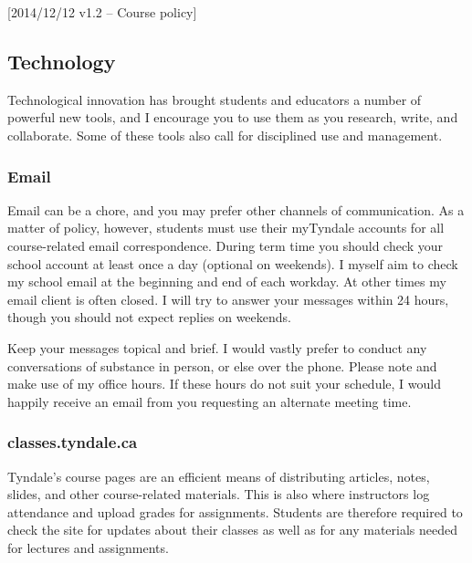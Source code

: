 [2014/12/12 v1.2 -- Course policy]

\subsection{Technology}
\label{technology}

Technological innovation has brought students and educators a number of
powerful new tools, and I encourage you to use them as you research, write, and
collaborate. Some of these tools also call for disciplined use and management.

\subsubsection{Email}
\label{email}

Email can be a chore, and you may prefer other channels of communication. As a
matter of policy, however, students must use their myTyndale accounts for all
course-related email correspondence. During term time you should check your
school account at least once a day (optional on weekends). I myself aim to
check my school email at the beginning and end of each workday. At other times
my email client is often closed. I will try to answer your messages within 24
hours, though you should not expect replies on weekends.

Keep your messages topical and brief. I would vastly prefer to conduct any
conversations of substance in person, or else over the phone. Please note and
make use of my office hours. If these hours do not suit your schedule, I would
happily receive an email from you requesting an alternate meeting time.


\subsubsection{classes.tyndale.ca}
\label{lms}

Tyndale's course pages are an efficient means of distributing articles, notes,
slides, and other course-related materials. This is also where instructors log
attendance and upload grades for assignments. Students are therefore required to
check the site for updates about their classes as well as for any materials
needed for lectures and assignments.

